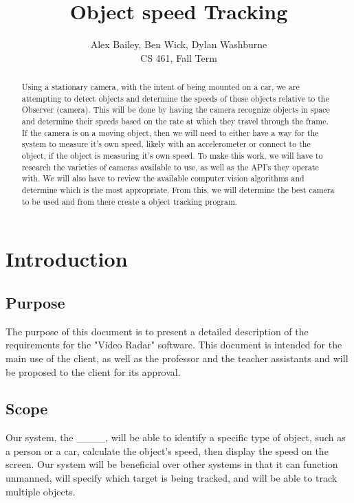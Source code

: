 \documentclass[letterpaper,10pt,onecolumn,draftclsnofoot]{IEEEtran}
\title{Object speed Tracking}
\author{Alex Bailey, Ben Wick, Dylan Washburne\\CS 461, Fall Term}
\begin{document}
\begin{titlepage}

\maketitle

\begin{abstract}
Using a stationary camera, with the intent of being mounted on a car, we are attempting to  detect objects and determine the speeds of those objects relative to the Observer (camera).
This will be done by having the camera recognize objects in space and determine their speeds based on the rate at which they travel through the frame.
If the camera is on a moving object, then we will need to either have a way for the system to measure it's own speed, likely with an accelerometer or connect to the object, if the object is measuring it's own speed.
To make this work, we will have to research the varieties of cameras available to use, as well as the API’s  they operate with.
We will also have to review the available computer vision algorithms and determine which is the most appropriate.
From this, we will determine the best camera to be used and from there create a object tracking program.
 
\end{abstract}

\end{titlepage}


\section{Introduction}
\subsection{Purpose}
The purpose of this document is to present a detailed description of the requirements for the "Video Radar" software.
This document is intended for the main use of the client, as well as the professor and the teacher assistants and will be proposed to the client for its approval.

\subsection{Scope}
Our system, the \_\_\_\_, will be able to identify a specific type of object, such as a person or a car, calculate the object's speed, then display the speed on the screen.
Our system will be beneficial over other systems in that it can function unmanned, will specify which target is being tracked, and will be able to track multiple objects.
\end{document}
